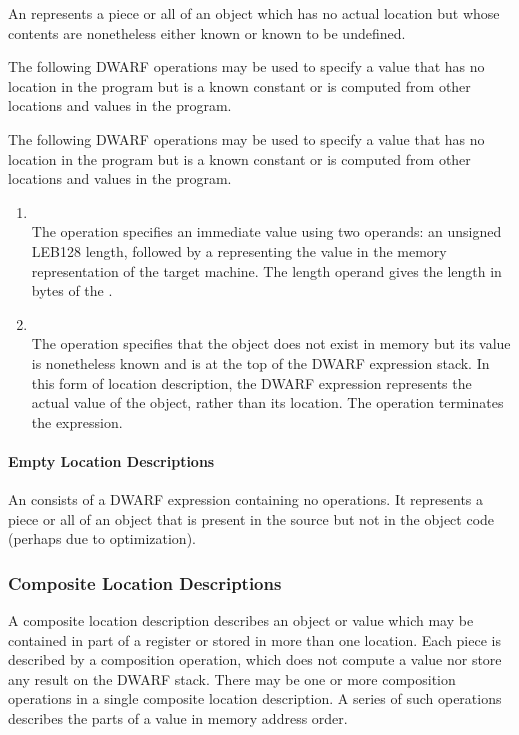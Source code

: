 An 
represents a piece or all
of an object which has no actual location but whose contents
are nonetheless either known or known to be undefined.

The following DWARF operations may be used to specify a value
that has no location in the program but is a known constant
or is computed from other locations and values in the program.

The following DWARF operations may be used to specify a value
that has no location in the program but is a known constant
or is computed from other locations and values in the program.

\begin{enumerate}[1]
\item {} \\
The  operation specifies an immediate value
using two operands: an unsigned LEB128 length, followed by
a  representing the value in the memory representation
of the target machine. The length operand gives the length
in bytes of the .

\item {} \\
The  operation specifies that the object
does not exist in memory but its value is nonetheless known
and is at the top of the DWARF expression stack. In this form
of location description, the DWARF expression represents the
actual value of the object, rather than its location. The
 operation terminates the expression.
\end{enumerate}


\paragraph{Empty Location Descriptions}

An 
consists of a DWARF expression
containing no operations. It represents a piece or all of an
object that is present in the source but not in the object code
(perhaps due to optimization).

\subsubsection{Composite Location Descriptions}
A composite location description describes an object or
value which may be contained in part of a register or stored
in more than one location. Each piece is described by a
composition operation, which does not compute a value nor
store any result on the DWARF stack. There may be one or
more composition operations in a single composite location
description. A series of such operations describes the parts
of a value in memory address order.


